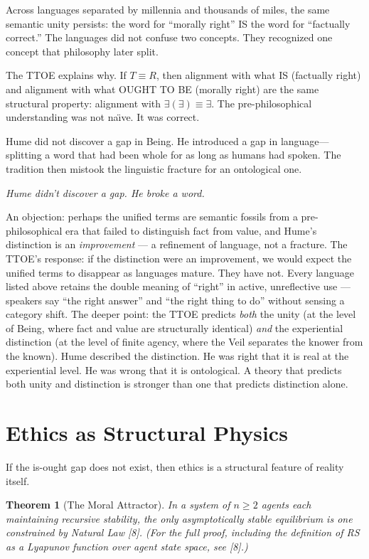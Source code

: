 \documentclass[12pt, letterpaper]{article}
\newtheorem{theorem}{Theorem}[section]
\begin{document}
Across languages separated by millennia and thousands of miles, the same semantic unity persists: the word for ``morally right'' IS the word for ``factually correct.'' The languages did not confuse two concepts. They recognized one concept that philosophy later split.

The TTOE explains why. If $T \equiv R$, then alignment with what IS (factually right) and alignment with what OUGHT TO BE (morally right) are the same structural property: alignment with $\exists(\exists) \equiv \exists$. The pre-philosophical understanding was not na\"{\i}ve. It was correct.

Hume did not discover a gap in Being. He introduced a gap in language---splitting a word that had been whole for as long as humans had spoken. The tradition then mistook the linguistic fracture for an ontological one.

\textit{Hume didn't discover a gap. He broke a word.}

An objection: perhaps the unified terms are semantic fossils from a pre-philosophical era that failed to distinguish fact from value, and Hume's distinction is an \textit{improvement} --- a refinement of language, not a fracture. The TTOE's response: if the distinction were an improvement, we would expect the unified terms to disappear as languages mature. They have not. Every language listed above retains the double meaning of ``right'' in active, unreflective use --- speakers say ``the right answer'' and ``the right thing to do'' without sensing a category shift. The deeper point: the TTOE predicts \textit{both} the unity (at the level of Being, where fact and value are structurally identical) \textit{and} the experiential distinction (at the level of finite agency, where the Veil separates the knower from the known). Hume described the distinction. He was right that it is real at the experiential level. He was wrong that it is ontological. A theory that predicts both unity and distinction is stronger than one that predicts distinction alone.

\section{Ethics as Structural Physics}

If the is-ought gap does not exist, then ethics is a structural feature of reality itself.

\begin{theorem}[The Moral Attractor]
\label{thm:attractor}
In a system of $n \geq 2$ agents each maintaining recursive stability, the only asymptotically stable equilibrium is one constrained by Natural Law [8]. (For the full proof, including the definition of RS as a Lyapunov function over agent state space, see [8].)
\end{theorem}
\end{document}
